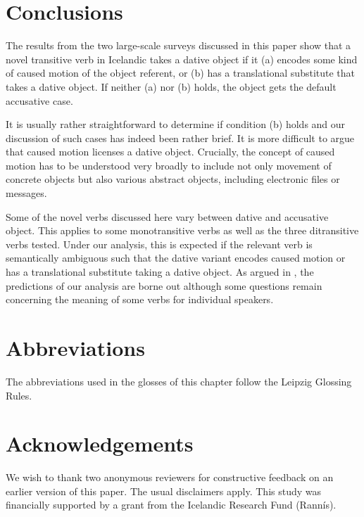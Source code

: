 \documentclass[output=paper,modfonts,nonflat,colorlinks,citecolor=brown]{langsci/langscibook}
\begin{document}
\section{Conclusions}
\label{sec:jonsson:5}

The results from the two large-scale surveys discussed in this paper show that a novel transitive verb in Icelandic takes a dative object if it (a) encodes some kind of caused motion of the object referent, or (b) has a translational substitute that takes a dative object. If neither (a) nor (b) holds, the object gets the default accusative case.

It is usually rather straightforward to determine if condition (b) holds and our discussion of such cases has indeed been rather brief. It is more difficult to argue that caused motion licenses a dative object. Crucially, the concept of caused motion has to be understood very broadly to include not only movement of concrete objects but also various abstract objects, including electronic files or messages.

Some of the novel verbs discussed here vary between dative and accusative object. This applies to some monotransitive verbs as well as the three ditransitive verbs tested. Under our analysis, this is expected if the relevant verb is semantically ambiguous such that the dative variant encodes caused motion or has a translational substitute taking a dative object. As argued in , the predictions of our analysis are borne out although some questions remain concerning the meaning of some verbs for individual speakers.


\section*{Abbreviations}
The abbreviations used in the glosses of this chapter follow the Leipzig Glossing Rules.

\section*{Acknowledgements}

We wish to thank two anonymous reviewers for constructive feedback on an earlier version of this paper. The usual disclaimers apply. This study was financially supported by a grant from the Icelandic Research Fund (Rannís).
\sloppy\printbibliography[heading=subbibliography,notkeyword=this]
\end{document}

